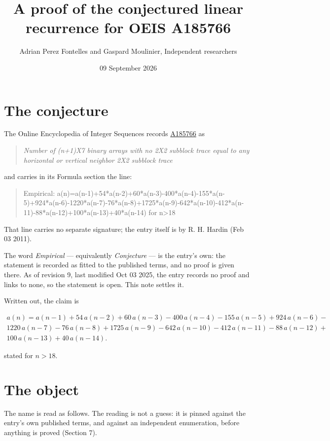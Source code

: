 \documentclass[11pt]{article}
\title{A proof of the conjectured linear recurrence for OEIS A185766}
\author{Adrian Perez Fontelles and Gaspard Moulinier, Independent researchers}
\date{09 September 2026}
\theoremstyle{definition}
\begin{document}
\maketitle
\section{The conjecture}

The Online Encyclopedia of Integer Sequences records \href{https://oeis.org/A185766}{A185766} as

\begin{quote}\itshape Number of (n+1)X7 binary arrays with no 2X2 subblock trace equal to any horizontal or vertical neighbor 2X2 subblock trace\end{quote}

and carries in its Formula section the line:

\begin{quote}\ttfamily Empirical: a(n)=a(n-1)+54*a(n-2)+60*a(n-3)-400*a(n-4)-155*a(n-5)+924*a(n-6)-1220*a(n-7)-76*a(n-8)+1725*a(n-9)-642*a(n-10)-412*a(n-11)-88*a(n-12)+100*a(n-13)+40*a(n-14) for n>18\end{quote}

That line carries no separate signature; the entry itself is by R. H. Hardin (Feb 03 2011).

The word {\itshape Empirical} --- equivalently {\itshape Conjecture} --- is the entry's own: the statement is recorded as fitted to the published terms, and no proof is given there. As of revision 9, last modified Oct 03 2025, the entry records no proof and links to none, so the statement is open. This note settles it.

Written out, the claim is

\begin{multline*} a(n) = a(n-1) + 54\,a(n-2) + 60\,a(n-3) - 400\,a(n-4) - 155\,a(n-5) + 924\,a(n-6) - \\ 1220\,a(n-7) - 76\,a(n-8) + 1725\,a(n-9) - 642\,a(n-10) - 412\,a(n-11) - 88\,a(n-12) + \\ 100\,a(n-13) + 40\,a(n-14). \end{multline*}

stated for $n > 18$.

\section{The object}

The name is read as follows. The reading is not a guess: it is pinned against the entry's own published terms, and against an independent enumeration, before anything is proved (Section 7).
\end{document}
